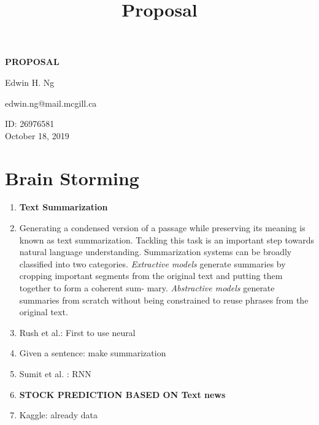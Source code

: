\documentclass[12pt,a4paper]{report}
\begin{document}
\title{Proposal\\
}


\setcounter{page}{1}
\thispagestyle{empty} 
\begin{titlepage}

    \begin{center}
        \vspace*{0.7cm}
         \Huge
        \textbf{PROPOSAL}
  
        \vspace{2cm}
          \Large
          Edwin H. Ng
                
        \vspace{2cm}
        
        edwin.ng@mail.mcgill.ca
                
        \vspace{2cm}

        \Large
        ID: 26976581\\
           \vspace{10cm}
        October 18, 2019\\
        \vspace{2cm}    
    \end{center}
\end{titlepage}


\chapter*{Brain Storming}
\begin{enumerate}
\item \textbf{Text Summarization}
\item Generating a condensed version of a passage while preserving its meaning is known as text summarization. Tackling this task is an important step towards natural language understanding. Summarization systems can be broadly classified into two categories. \textit{Extractive models} generate summaries by cropping important segments from the original text and putting them together to form a coherent sum- mary. \textit{Abstractive models} generate summaries from scratch without being constrained to reuse phrases from the original text.
\item Rush et al.: First to use neural
\item Given a sentence: make summarization
\item Sumit et al. : RNN
\item \textbf{STOCK PREDICTION BASED ON Text news}
\item Kaggle: already data
\end{enumerate}
\end{document}

